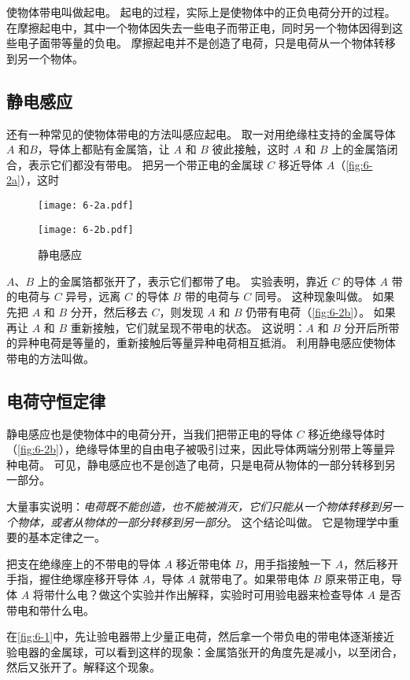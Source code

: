 使物体带电叫做起电。
起电的过程，实际上是使物体中的正负电荷分开的过程。
在摩擦起电中，其中一个物体因失去一些电子而带正电，同时另一个物体因得到这些电子面带等量的负电。
摩擦起电并不是创造了电荷，只是电荷从一个物体转移到另一个物体。

\subsection{静电感应} 

还有一种常见的使物体带电的方法叫感应起电。
取一对用绝缘柱支持的金属导体 $A$ 和$B$，导体上都贴有金属箔，让 $A$ 和 $B$ 彼此接触，这时 $A$ 和 $B$ 上的金属箔闭合，表示它们都没有带电。
把另一个带正电的金属球 $C$ 移近导体 $A$（\cref{fig:6-2a}），这时
\begin{figure}
	\begin{minipage}[b]{0.45\linewidth}\centering
		\texttt{[image: 6-2a.pdf]}
		\subcaption{}\label{fig:6-2a}
	\end{minipage}
	\begin{minipage}[b]{0.45\linewidth}\centering
		\texttt{[image: 6-2b.pdf]}
		\subcaption{}\label{fig:6-2b}
	\end{minipage}
	\caption{静电感应}\label{fig:6-2}
\end{figure}
$A$、$B$ 上的金属箔都张开了，表示它们都带了电。
实验表明，靠近 $C$ 的导体 $A$ 带的电荷与 $C$ 异号，远离 $C$ 的导体 $B$ 带的电荷与 $C$ 同号。
这种现象叫做。
如果先把 $A$ 和 $B$ 分开，然后移去 $C$，则发现 $A$ 和 $B$ 仍带有电荷（\cref{fig:6-2b}）。
如果再让 $A$ 和 $B$ 重新接触，它们就呈现不带电的状态。
这说明：$A$ 和 $B$ 分开后所带的异种电荷是等量的，重新接触后等量异种电荷相互抵消。
利用静电感应使物体带电的方法叫做。

\subsection{电荷守恒定律} 
静电感应也是使物体中的电荷分开，当我们把带正电的导体 $C$ 移近绝缘导体时（\cref{fig:6-2b}），绝缘导体里的自由电子被吸引过来，因此导体两端分别带上等量异种电荷。
可见，静电感应也不是创造了电荷，只是电荷从物体的一部分转移到另一部分。

大量事实说明：\emph{电荷既不能创造，也不能被消灭，它们只能从一个物体转移到另一个物体，或者从物体的一部分转移到另一部分}。
这个结论叫做。
它是物理学中重要的基本定律之一。

\begin{Practice}
\begin{question}
\item 把支在绝缘座上的不带电的导体 $A$ 移近带电体 $B$，用手指接触一下 $A$，然后移开手指，握住绝塚座移开导体 $A$，导体 $A$ 就带电了。如果带电体 $B$ 原来带正电，导体 $A$ 将带什么电？做这个实验并作出解释，实验时可用验电器来检查导体 $A$ 是否带电和带什么电。
\item 在\cref{fig:6-1}中，先让验电器带上少量正电荷，然后拿一个带负电的带电体逐渐接近验电器的金属球，可以看到这样的现象：金属箔张开的角度先是减小，以至闭合，然后又张开了。解释这个现象。
\end{question}
\end{Practice}

